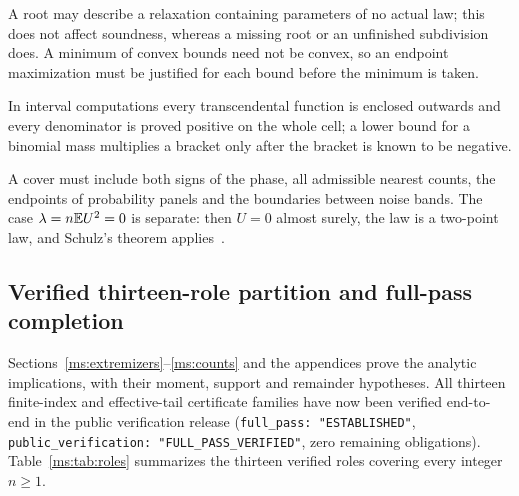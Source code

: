A root may describe a relaxation containing parameters of no actual law;
this does not affect soundness, whereas a missing root or an unfinished
subdivision does. A minimum of convex bounds need not be convex, so an
endpoint maximization must be justified for each bound before the minimum
is taken.

In interval computations every transcendental function is enclosed
outwards and every denominator is proved positive on the whole cell; a
lower bound for a binomial mass multiplies a bracket only after the
bracket is known to be negative.

A cover must include both signs of the phase, all admissible nearest
counts, the endpoints of probability panels and the boundaries between
noise bands. The case $\lambda=n\mathbb E U^2=0$ is separate: then $U=0$ almost
surely, the law is a two-point law, and Schulz's theorem
applies~\cite{Schulz2016}.

\subsection{Verified thirteen-role partition and full-pass completion}

Sections~\ref{ms:extremizers}--\ref{ms:counts} and the appendices prove the
analytic implications, with their moment, support and remainder hypotheses.
All thirteen finite-index and effective-tail certificate families have now been
verified end-to-end in the public verification release
(\texttt{full\_pass: "ESTABLISHED"}, \texttt{public\_verification: "FULL\_PASS\_VERIFIED"},
zero remaining obligations). Table~\ref{ms:tab:roles} summarizes the thirteen
verified roles covering every integer $n\ge1$.

